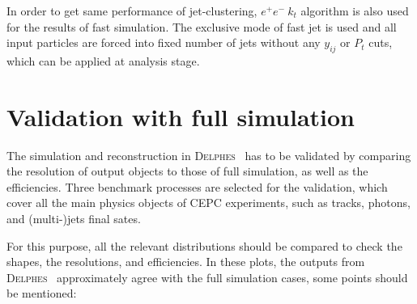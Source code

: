 \documentclass[a4paper,10pt,twoside]{cpc-hepnp}
\begin{document}
In order to get same performance of jet-clustering, $e^+e^-~k_t$ algorithm is also used for the results of fast simulation. The exclusive mode of fast jet is used and  all input particles are forced into fixed number of jets without any $y_{ij}$ or $P_t$ cuts, which can be applied at analysis stage.  

\section{Validation with full simulation\label{sec:validation}}

The simulation and reconstruction in {\textsc{Delphes}~} has to be validated by comparing the resolution of output objects to those of full simulation, as well as the efficiencies. Three  benchmark processes are selected for the validation, which cover all the main physics objects of CEPC experiments, such as tracks, photons, and (multi-)jets final sates.   

For this purpose, all the relevant distributions should be compared to check the shapes, the resolutions, and efficiencies.    In these plots, the outputs from {\textsc{Delphes}~} approximately agree with the full simulation cases, some points should be mentioned:
\end{document}

